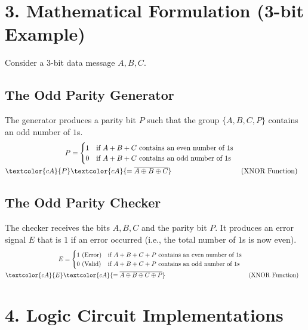 \documentclass[12pt,a3paper]{article}
\begin{document}
\begin{enumerate}
\begin{tcolorbox}[enhanced,breakable,ansbox,colback=cA!4,colframe=cA,boxrule=0.8pt,arc=5pt,title={\textbf{Answer}},fonttitle=\bfseries\color{white},colbacktitle=cA]
\vspace{0.4cm}

\section*{3. Mathematical Formulation (3-bit Example)}

Consider a 3-bit data message $A, B, C$.

\subsection*{The Odd Parity Generator}
The generator produces a parity bit $P$ such that the group $\{A, B, C, P\}$ contains an odd number of $1$s. 
\begin{align*}
    P &= \begin{cases} 
      1 & \text{if } A+B+C \text{ contains an even number of 1s} \\
      0 & \text{if } A+B+C \text{ contains an odd number of 1s}
   \end{cases} \\
    \textcolor{cA}{P} &\textcolor{cA}{= \overline{A \oplus B \oplus C}} && \text{(XNOR Function)}
\end{align*}

\subsection*{The Odd Parity Checker}
The checker receives the bits $A, B, C$ and the parity bit $P$. It produces an error signal $E$ that is $1$ if an error occurred (i.e., the total number of $1$s is now even).
\begin{align*}
    E &= \begin{cases} 
      1 \text{ (Error)} & \text{if } A+B+C+P \text{ contains an even number of 1s} \\
      0 \text{ (Valid)} & \text{if } A+B+C+P \text{ contains an odd number of 1s}
   \end{cases} \\
    \textcolor{cA}{E} &\textcolor{cA}{= \overline{A \oplus B \oplus C \oplus P}} && \text{(XNOR Function)}
\end{align*}

\vspace{0.4cm}

\section*{4. Logic Circuit Implementations}


\end{tcolorbox}
\end{enumerate}
\end{document}
